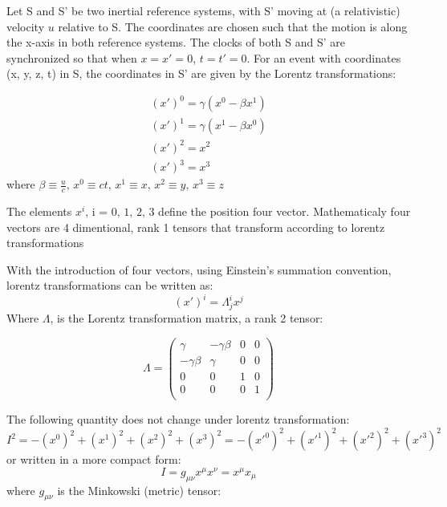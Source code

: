Let S and S' be two inertial reference systems, with S' moving at (a relativistic) velocity \(u\) relative to S. The coordinates are chosen such that the motion is along the x-axis in both reference systems. The clocks of both S and S' are synchronized so that when \(x = x' = 0\), \(t = t' = 0\).
For an event with coordinates (x, y, z, t) in S, the coordinates in S' are given by the Lorentz transformations:

\begin{equation}
\begin{matrix}
(x')^{0} = \gamma(x^{0} - \beta x^{1}) \\
(x')^{1} = \gamma(x^{1} - \beta x^{0}) \\
(x')^{2} = x^{2} \\
(x')^{3} = x^{3}
\end{matrix}
\end{equation}
where \(\beta \equiv \frac{u}{c}\text{,   } x^{0}\equiv ct\text{,    } x^{1}\equiv x\text{,   } x^{2}\equiv y\text{,   } x^{3}\equiv z\)

The elements \(x^{i}\text{, i = 0, 1, 2, 3}\) define the position four vector. Mathematicaly four vectors are 4 dimentional, rank 1 tensors that transform according to lorentz transformations

With the introduction of four vectors, using Einstein's summation convention, lorentz transformations can be written as:
\begin{equation}
(x')^{i} = \Lambda^{i}_{j}x^{j}
\end{equation}
Where \(\Lambda\), is the Lorentz transformation matrix, a rank 2 tensor:

\begin{equation}
\Lambda = \begin{pmatrix}
 \gamma & -\gamma \beta &  0 & 0 \\
  -\gamma \beta & \gamma &   0 & 0 \\
  0 & 0& 1 &0\\
  0 & 0& 0 &1\\
  \end{pmatrix}
  \end{equation}

The following quantity does not change under lorentz transformation:
\begin{equation}
I^{2} = -(x^{0})^{2} + (x^{1})^{2} + (x^{2})^{2} +(x^{3})^{2} = -(x'^{0})^{2} + (x'^{1})^{2} + (x'^{2})^{2} +(x'^{3})^{2}
\end{equation}
or written in a more compact form:
\begin{equation}
I = g_{\mu \nu}x^{\mu}x^{\nu} = x^{\mu}x_{\mu}
\end{equation} 
where \(g_{\mu\nu}\) is the Minkowski (metric) tensor:

